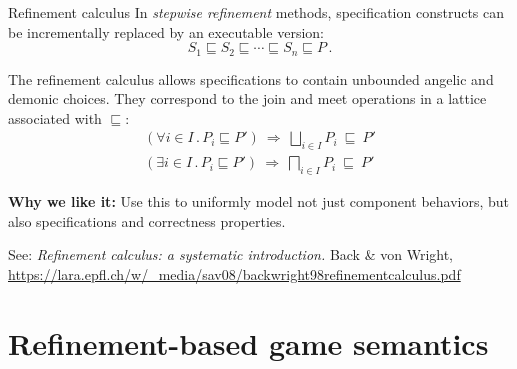 \documentclass{beamer}
\begin{document}
\begin{frame}{Refinement calculus}
  In \emph{stepwise refinement} methods,
  specification constructs can be
  incrementally replaced by an executable version:
  \[
      S_1 \sqsubseteq S_2 \sqsubseteq \cdots \sqsubseteq
      S_n \sqsubseteq P \,.
  \]

  The refinement calculus allows specifications to contain
  unbounded angelic and demonic choices.
  They correspond to the join and meet operations
  in a lattice associated with $\sqsubseteq$:
  \begin{gather*}
    (\forall i \in I \,.\, P_i \sqsubseteq P')
    \: \Rightarrow \:
    \bigsqcup_{i \in I} P_i \: \sqsubseteq \: P'
    \\
    (\exists i \in I \,.\, P_i \sqsubseteq P')
    \: \Rightarrow \:
    \bigsqcap_{i \in I} P_i \: \sqsubseteq \: P'
  \end{gather*}

  \textbf{Why we like it:}
  Use this to uniformly model
  not just component behaviors,
  but also specifications and correctness properties.

  \vfill
  \small
  See: \emph{Refinement calculus: a systematic introduction.}
  Back \& von Wright,
  \tiny \url{https://lara.epfl.ch/w/_media/sav08/backwright98refinementcalculus.pdf}
\end{frame}

\section{Refinement-based game semantics}
\end{document}
